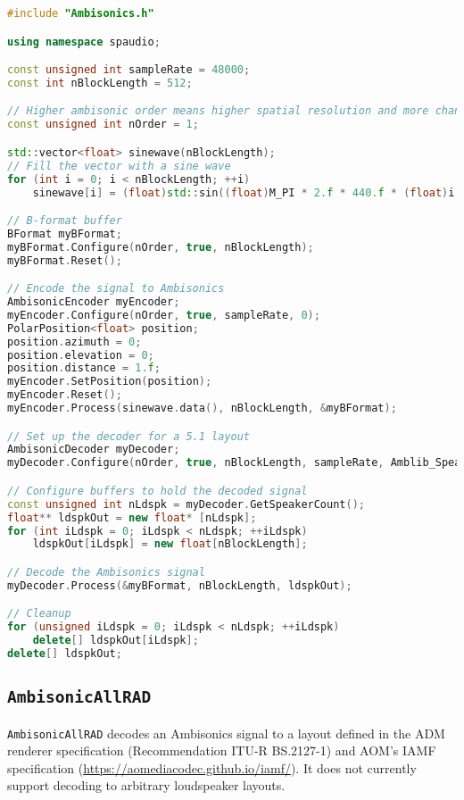 \documentclass[12pt]{report}
\newcommand{\code}[1]{\texttt{#1}}
\begin{document}
\begin{lstlisting}[language=C++]
#include "Ambisonics.h"

using namespace spaudio;

const unsigned int sampleRate = 48000;
const int nBlockLength = 512;

// Higher ambisonic order means higher spatial resolution and more channels required
const unsigned int nOrder = 1;

std::vector<float> sinewave(nBlockLength);
// Fill the vector with a sine wave
for (int i = 0; i < nBlockLength; ++i)
    sinewave[i] = (float)std::sin((float)M_PI * 2.f * 440.f * (float)i / (float)sampleRate);

// B-format buffer
BFormat myBFormat;
myBFormat.Configure(nOrder, true, nBlockLength);
myBFormat.Reset();

// Encode the signal to Ambisonics
AmbisonicEncoder myEncoder;
myEncoder.Configure(nOrder, true, sampleRate, 0);
PolarPosition<float> position;
position.azimuth = 0;
position.elevation = 0;
position.distance = 1.f;
myEncoder.SetPosition(position);
myEncoder.Reset();
myEncoder.Process(sinewave.data(), nBlockLength, &myBFormat);

// Set up the decoder for a 5.1 layout
AmbisonicDecoder myDecoder;
myDecoder.Configure(nOrder, true, nBlockLength, sampleRate, Amblib_SpeakerSetUps::kAmblib_51);

// Configure buffers to hold the decoded signal
const unsigned int nLdspk = myDecoder.GetSpeakerCount();
float** ldspkOut = new float* [nLdspk];
for (int iLdspk = 0; iLdspk < nLdspk; ++iLdspk)
    ldspkOut[iLdspk] = new float[nBlockLength];

// Decode the Ambisonics signal
myDecoder.Process(&myBFormat, nBlockLength, ldspkOut);

// Cleanup
for (unsigned iLdspk = 0; iLdspk < nLdspk; ++iLdspk)
    delete[] ldspkOut[iLdspk];
delete[] ldspkOut;
\end{lstlisting}

\subsection{\code{AmbisonicAllRAD}}\label{AmbisonicAllRAD}

\code{AmbisonicAllRAD} decodes an Ambisonics signal to a layout defined in the ADM renderer specification (Recommendation ITU-R BS.2127-1) and AOM's IAMF specification (\href{https://aomediacodec.github.io/iamf/}{https://aomediacodec.github.io/iamf/}). It does not currently support decoding to arbitrary loudspeaker layouts.
\end{document}
